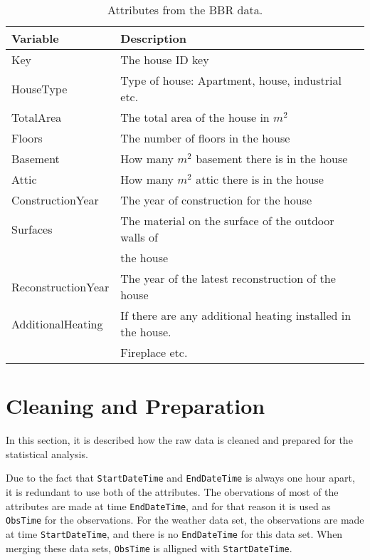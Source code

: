 \begin{table}[H]
    \centering
    \begin{tabular}{ll}
     \hline
     \textbf{Variable} & \textbf{Description} \\
    \hline
    \hline
    Key  &  The house ID key\\
    HouseType  &  Type of house: Apartment, house, industrial etc. \\
    TotalArea  & The total area of the house in $m^2$ \\
    Floors  & The number of floors in the house \\
    Basement  & How many $m^2$ basement there is in the house \\
    Attic  & How many $m^2$ attic there is in the house \\
    ConstructionYear  & The year of construction for the house  \\
    Surfaces  & The material on the surface of the outdoor walls of \\ & the house \\
    ReconstructionYear  & The year of the latest reconstruction of the house \\
    AdditionalHeating  & If there are any additional heating installed in the house. \\ & Fireplace etc. \\
    \hline
    \end{tabular}
    \caption{Attributes from the BBR data.}
    \label{tab: BBR}
\end{table}


\section{Cleaning and Preparation}
In this section, it is described how the raw data is cleaned and prepared for the statistical analysis.

\noindent Due to the fact that \texttt{StartDateTime} and \texttt{EndDateTime} is always one hour apart, it is redundant to use both of the attributes. The obervations of most of the attributes are made at time \texttt{EndDateTime}, and for that reason it is used as \texttt{ObsTime} for the observations. For the weather data set, the observations are made at time \texttt{StartDateTime}, and there is no \texttt{EndDateTime} for this data set. When merging these data sets, \texttt{ObsTime} is alligned with \texttt{StartDateTime}. 

